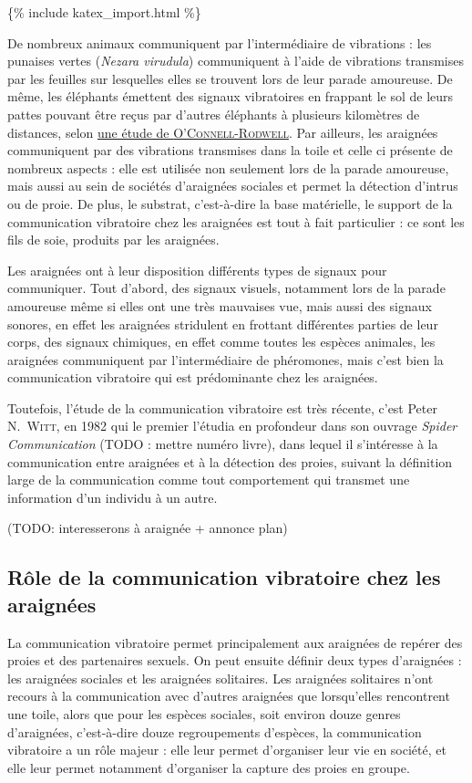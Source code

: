 \{\% include katex\_import.html \%\}

De nombreux animaux communiquent par l'intermédiaire de vibrations : les
punaises vertes (\emph{Nezara virudula}) communiquent à l'aide de
vibrations transmises par les feuilles sur lesquelles elles se trouvent
lors de leur parade amoureuse. De même, les éléphants émettent des
signaux vibratoires en frappant le sol de leurs pattes pouvant être
reçus par d'autres éléphants à plusieurs kilomètres de distances, selon
\href{http://www.ncbi.nlm.nih.gov/pubmed/11144599}{une étude de
\textsc{O'Connell-Rodwell}}. Par ailleurs, les araignées communiquent
par des vibrations transmises dans la toile et celle ci présente de
nombreux aspects : elle est utilisée non seulement lors de la parade
amoureuse, mais aussi au sein de sociétés d'araignées sociales et permet
la détection d'intrus ou de proie. De plus, le substrat, c'est-à-dire la
base matérielle, le support de la communication vibratoire chez les
araignées est tout à fait particulier : ce sont les fils de soie,
produits par les araignées.

Les araignées ont à leur disposition différents types de signaux pour
communiquer. Tout d'abord, des signaux visuels, notamment lors de la
parade amoureuse même si elles ont une très mauvaises vue, mais aussi
des signaux sonores, en effet les araignées stridulent en frottant
différentes parties de leur corps, des signaux chimiques, en effet comme
toutes les espèces animales, les araignées communiquent par
l'intermédiaire de phéromones, mais c'est bien la communication
vibratoire qui est prédominante chez les araignées.

Toutefois, l'étude de la communication vibratoire est très récente,
c'est Peter N.~\textsc{Witt}, en 1982 qui le premier l'étudia en
profondeur dans son ouvrage \emph{Spider Communication} (TODO : mettre
numéro livre), dans lequel il s'intéresse à la communication entre
araignées et à la détection des proies, suivant la définition large de
la communication comme tout comportement qui transmet une information
d'un individu à un autre.

(TODO: interesserons à araignée + annonce plan)

\subsection{Rôle de la communication vibratoire chez les
araignées}\label{ruxf4le-de-la-communication-vibratoire-chez-les-araignuxe9es}

La communication vibratoire permet principalement aux araignées de
repérer des proies et des partenaires sexuels. On peut ensuite définir
deux types d'araignées : les araignées sociales et les araignées
solitaires. Les araignées solitaires n'ont recours à la communication
avec d'autres araignées que lorsqu'elles rencontrent une toile, alors
que pour les espèces sociales, soit environ douze genres d'araignées,
c'est-à-dire douze regroupements d'espèces, la communication vibratoire
a un rôle majeur : elle leur permet d'organiser leur vie en société, et
elle leur permet notamment d'organiser la capture des proies en groupe.

